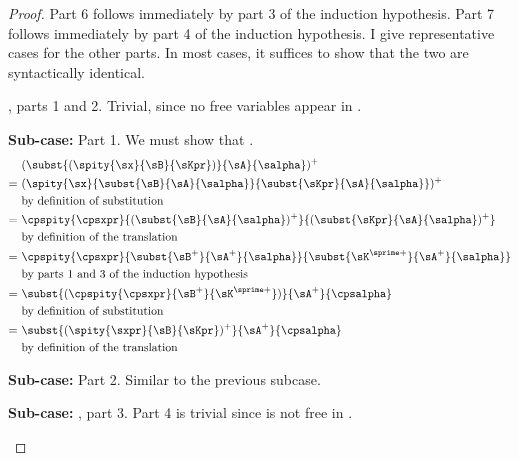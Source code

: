 {\begin{proof}
    Part 6 follows immediately by part 3 of the induction hypothesis.
    Part 7 follows immediately by part 4 of the induction hypothesis.
    I give representative cases for the other parts.
    In most cases, it suffices to show that the two  are
    syntactically identical.
    \begin{proofcases}
    \item {} \im{\st = \sU}, parts 1 and 2. Trivial, since no free variables appear in \im{\sU}.
    \item {} \im{\st = \spity{\sx}{\sB}{\sKpr}}
    \item[{\bfseries Sub-case:}] Part 1. We must show that
      \im{(\subst{(\spity{\sx}{\sB}{\sKpr})}{\sA}{\salpha})^+ =
        \subst{(\spity{\sx}{\sB}{\sKpr})^+}{\sA^+}{\cpsalpha}}.
      \begin{align}
        & (\subst{(\spity{\sx}{\sB}{\sKpr})}{\sA}{\salpha})^+ \nonumber \\
        =~&(\spity{\sx}{\subst{\sB}{\sA}{\salpha}}{\subst{\sKpr}{\sA}{\salpha}})^+ \\
        & \text{by definition of substitution} \nonumber \\
        =~& \cpspity{\cpsxpr}{(\subst{\sB}{\sA}{\salpha})^+}{(\subst{\sKpr}{\sA}{\salpha})^+} \\
        & \text{by definition of the translation} \nonumber \\
        =~& \cpspity{\cpsxpr}{\subst{\sB^+}{\sA^+}{\salpha}}{\subst{\sK^{\sprime+}}{\sA^+}{\salpha}} \\
        & \text{by parts 1 and 3 of the induction hypothesis} \nonumber \\
        =~& \subst{(\cpspity{\cpsxpr}{\sB^+}{\sK^{\sprime+}})}{\sA^+}{\cpsalpha} \\
        & \text{by definition of substitution} \nonumber \\
        =~& \subst{(\spity{\sxpr}{\sB}{\sKpr})^+}{\sA^+}{\cpsalpha} \\
        & \text{by definition of the translation} \nonumber
      \end{align}
      \item[{\bfseries Sub-case:}] Part 2. Similar to the previous subcase.

      \item {}
      \item[{\bfseries Sub-case:}] \im{\st = \salphapr}, part 3. Part 4 is trivial since \im{\sx} is not free in
      \im{\salpha}.


\end{proofcases}
\end{proof}}
